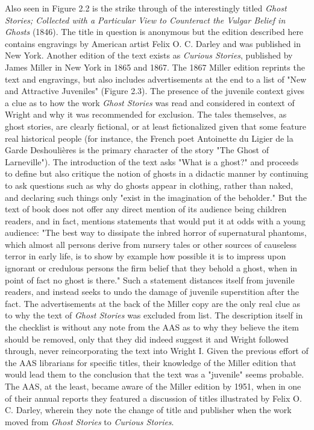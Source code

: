 Also seen in Figure 2.2 is the strike through of the interestingly titled \textit{Ghost Stories; Collected with a Particular View to Counteract the Vulgar Belief in Ghosts} (1846). The title in question is anonymous but the edition described here contains engravings by American artist Felix O. C. Darley and was published in New York. Another edition of the text exists as \textit{Curious Stories}, published by James Miller in New York in 1865 and 1867. The 1867 Miller edition reprints the text and engravings, but also includes advertisements at the end to a list of "New and Attractive Juveniles" (Figure 2.3).\autocite[222]{the_library_of_congress_curious_1867} The presence of the juvenile context gives a clue as to how the work \textit{Ghost Stories} was read and considered in context of Wright and why it was recommended for exclusion. The tales themselves, as ghost stories, are clearly fictional, or at least fictionalized given that some feature real historical people (for instance, the French poet Antoinette du Ligier de la Garde Deshoulières is the primary character of the story "The Ghost of Larneville"). The introduction of the text asks "What is a ghost?" and proceeds to define but also critique the notion of ghosts in a didactic manner by continuing to ask  questions such as why do ghosts appear in clothing, rather than naked, and declaring such things only "exist in the imagination of the beholder."\autocite[5]{new_york_public_library_ghost_1846} But the text of book does not offer any direct mention of its audience being children readers, and in fact, mentions statements that would put it at odds with a young audience: "The best way to dissipate the inbred horror of supernatural phantoms, which almost all persons derive from nursery tales or other sources of causeless terror in early life, is to show by example how possible it is to impress upon ignorant or credulous persons the firm belief that they behold a ghost, when in point of fact no ghost is there."\autocite[6]{new_york_public_library_ghost_1846} Such a statement distances itself from juvenile readers, and instead seeks to undo the damage of juvenile superstition after the fact. The advertisements at the back of the Miller copy are the only real clue as to why the text of \textit{Ghost Stories} was excluded from list.  The description itself in the checklist is without any note from the AAS as to why they believe the item should be removed, only that they did indeed suggest it and Wright followed through, never reincorporating the text into Wright I. Given the previous effort of the AAS librarians for specific titles, their knowledge of the Miller edition that would lead them to the conclusion that the text was a "juvenile" seems probable. The AAS, at the least, became aware of the Miller edition by 1951, when in one of their annual reports they featured a discussion of titles illustrated by Felix O. C. Darley, wherein they note the change of title and publisher when the work moved from \textit{Ghost Stories} to \textit{Curious Stories}.\autocite[147]{theodore_bolton_book_1951}
  
